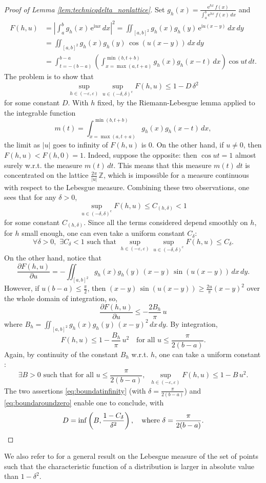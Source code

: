 \documentclass[12pt,a4paper,reqno]{amsart}
\theoremstyle{remark}
\newcommand{\Z}{\mathbb{Z}}
\newcommand{\E}{\mathrm{e}}
\newcommand{\I}{\mathrm{i}}
\newcommand{\eps}{\varepsilon}
\begin{document}
\begin{proof}[Proof of Lemma \ref{lem:technicqdelta_nonlattice}]
Set $g_h(x)=\frac{\E^{hx}\,f(x)}{\int_a^b \E^{hx}\,f(x)\,dx}$ and 
\begin{align*}
F(h,u)&=\left|\int_a^b g_h(x)\,\E^{\I u x}\,dx\right|^2=\iint_{[a,b]^2} g_h(x)g_h(y)\, \E^{\I u (x-y)}\,dx \,dy \\
&=\iint_{[a,b]^2} g_h(x)g_h(y)\, \cos (u (x-y))\,dx \,dy \\
&=\int_{t=-(b-a)}^{b-a}  \left(\int_{x=\max(a,t+a)}^{\min(b,t+b)}g_h(x)g_h(x-t)\,dx\right)\cos ut\,dt.
\end{align*}
The problem is to show that
$$\sup_{h \in (-\eps,\eps)} \sup_{u \in (-\delta,\delta)^\mathrm{c}} F(h,u) \leq 1-D\,\delta^2$$
for some constant $D$. With $h$ fixed, by the Riemann-Lebesgue lemma applied to the integrable function
$$m(t)=\int_{x=\max(a,t+a)}^{\min(b,t+b)}g_h(x)g_h(x-t)\,dx,$$ 
the limit as $|u|$ goes to infinity of $F(h,u)$ is $0$. On the other hand, if $u \neq 0$, then $F(h,u)<F(h,0)=1$. Indeed, suppose the opposite: then $\cos ut=1$ almost surely w.r.t. the measure $m(t)\,dt$. This means that this measure $m(t)\,dt$ is concentrated on the lattice $\frac{2\pi}{|u|}\,\Z$, which is impossible for a measure continuous with respect to  the Lebesgue measure. Combining these two observations, one sees that for any $\delta>0$,
$$\sup_{u \in (-\delta,\delta)^{\mathrm{c}}} F(h,u) \leq C_{(h,\delta)}<1$$
for some constant $C_{(h,\delta)}$. Since all the terms considered depend smoothly on $h$, for $h $ small enough, one can even take a uniform constant $C_\delta$:
\begin{equation}\forall \delta>0,\,\,\exists C_\delta<1 \text{ such that }\sup_{h \in (-\eps,\eps)} \sup_{u \in (-\delta,\delta)^{\mathrm{c}}} F(h,u) \leq C_\delta.\label{eq:boundatinfinity}
\end{equation}
On the other hand, notice that
$$
\frac{\partial F(h,u)}{\partial u} = -\iint_{[a,b]^2} g_h(x)g_h(y) \,(x-y)\,\sin(u(x-y))\,dx\,dy.$$
However, if $u(b-a)\leq \frac{\pi}{2}$, then $(x-y)\,\sin(u(x-y))\geq \frac{2 u}{\pi}(x-y)^2$ over the whole domain of integration, so,
$$\frac{\partial F(h,u)}{\partial u} \leq -\frac{2 B_h}{\pi}\, u$$
where $B_h=\iint_{[a,b]^2}g_h(x)g_h(y)\,(x-y)^2\,dx\,dy$. By integration, 
$$F(h,u) \leq 1-\frac{B_h}{\pi}\,u^2 \quad \text{for all } u \leq  \frac{\pi}{2(b-a)}.$$
Again, by continuity of the constant $B_h$ w.r.t. $h$, one can take a uniform constant :
\begin{equation}\exists B>0 \text{ such that for all } u \leq  \frac{\pi}{2(b-a)},\,\,\,\sup_{h \in (-\eps,\eps)} F(h,u) \leq 1-B\,u^2.\label{eq:boundaroundzero}\end{equation}
The two assertions \eqref{eq:boundatinfinity} (with $\delta=\frac{\pi}{2(b-a)}$) and \eqref{eq:boundaroundzero} enable one to conclude, with
\[D=\inf\left(B,\frac{1-C_\delta}{\delta^2}\right), \quad\text{where }\delta=\frac{\pi}{2(b-a)}. \qedhere\]
\end{proof}
\noindent We also refer to \cite[Theorem 6]{Ess45} for a general result on the Lebesgue measure of the set of points such that the characteristic function of a distribution is larger in absolute value than $1-\delta^{2}$. 
\bigskip
\end{document}
